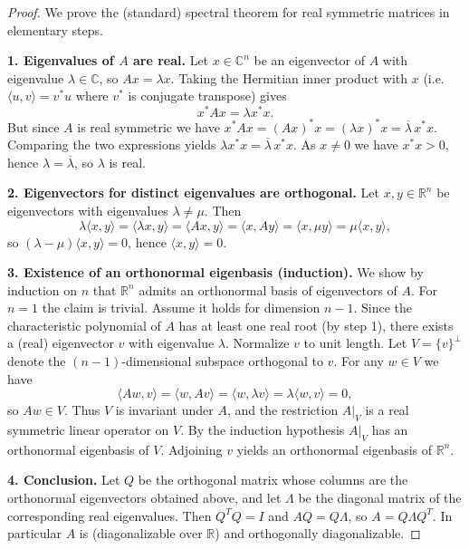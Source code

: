 \documentclass[12pt,a4paper,openany]{book}
\begin{document}
\begin{proof}
We prove the (standard) spectral theorem for real symmetric matrices in
elementary steps.

\textbf{1. Eigenvalues of $A$ are real.}  
Let $x\in\mathbb{C}^n$ be an eigenvector of $A$ with eigenvalue
$\lambda\in\mathbb{C}$, so $Ax=\lambda x$. Taking the Hermitian inner
product with $x$ (i.e.\ $\langle u,v\rangle = v^{*}u$ where $v^*$ is
conjugate transpose) gives
\[
x^{*}Ax = \lambda x^{*}x.
\]
But since $A$ is real symmetric we have $x^{*}Ax=(Ax)^{*}x=(\lambda x)^{*}x
=\overline{\lambda}\, x^{*}x$. Comparing the two expressions yields
$\lambda x^{*}x=\overline{\lambda}\, x^{*}x$. As $x\neq 0$ we have
$x^{*}x>0$, hence $\lambda=\overline{\lambda}$, so $\lambda$ is real.

\textbf{2. Eigenvectors for distinct eigenvalues are orthogonal.}  
Let $x,y\in\mathbb{R}^n$ be eigenvectors with eigenvalues
$\lambda\neq\mu$. Then
\[
\lambda \langle x,y\rangle = \langle \lambda x, y\rangle = \langle Ax,y\rangle
= \langle x, A y\rangle = \langle x, \mu y\rangle = \mu \langle x,y\rangle,
\]
so $(\lambda-\mu)\langle x,y\rangle=0$, hence $\langle x,y\rangle=0$.

\textbf{3. Existence of an orthonormal eigenbasis (induction).}  
We show by induction on $n$ that $\mathbb{R}^n$ admits an orthonormal
basis of eigenvectors of $A$. For $n=1$ the claim is trivial. Assume it
holds for dimension $n-1$. Since the characteristic polynomial of $A$
has at least one real root (by step 1), there exists a (real) eigenvector
$v$ with eigenvalue $\lambda$. Normalize $v$ to unit length. Let
$V=\{v\}^{\perp}$ denote the $(n-1)$-dimensional subspace orthogonal to
$v$. For any $w\in V$ we have
\[
\langle Aw, v\rangle = \langle w, Av\rangle = \langle w,\lambda v\rangle = \lambda\langle w,v\rangle =0,
\]
so $Aw\in V$. Thus $V$ is invariant under $A$, and the restriction
$A|_{V}$ is a real symmetric linear operator on $V$. By the induction
hypothesis $A|_V$ has an orthonormal eigenbasis of $V$. Adjoining $v$
yields an orthonormal eigenbasis of $\mathbb{R}^n$.

\textbf{4. Conclusion.}  
Let $Q$ be the orthogonal matrix whose columns are the orthonormal
eigenvectors obtained above, and let $\Lambda$ be the diagonal matrix of
the corresponding real eigenvalues. Then $Q^{T}Q=I$ and
$A Q = Q\Lambda$, so $A = Q\Lambda Q^{T}$. In particular $A$ is
(diagonalizable over $\mathbb{R}$) and orthogonally diagonalizable.
\end{proof}
\end{document}
